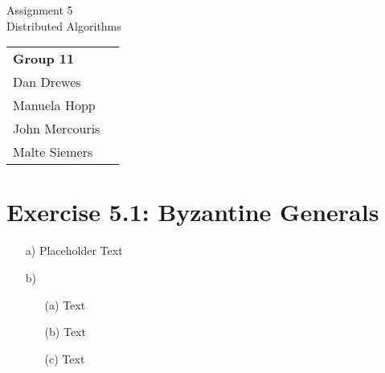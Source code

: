 \documentclass[12pt,a4paper]{article}
\begin{document}
\begin{center}
  \Large Assignment 5 \\
  \large Distributed Algorithms
\end{center}
\begin{flushright}
  \begin{tabular}{ll}
    \textbf{Group 11} \\
    Dan Drewes        \\ 
    Manuela Hopp      \\ 
    John Mercouris    \\
    Malte Siemers     \\
  \end{tabular} 
\end{flushright}



\section*{Exercise 5.1: Byzantine Generals}
\begin{enumerate}
\item[a)] Placeholder Text
\item[b)]
  \begin{enumerate}
  \item[(a)] Text
  \item[(b)] Text
  \item[(c)] Text
  \end{enumerate}
\end{enumerate}
\end{document}
